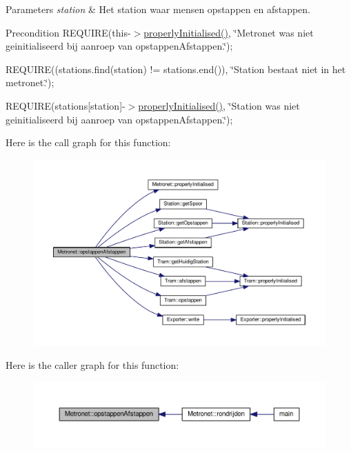 \begin{DoxyParams}{Parameters}
{\em station} & Het station waar mensen opstappen en afstappen. \\
\hline
\end{DoxyParams}
\begin{DoxyPrecond}{Precondition}
R\+E\+Q\+U\+I\+RE(this-\/$>$\hyperlink{class_metronet_a3d2adce29a947f162924279b766de645}{properly\+Initialised()}, \char`\"{}\+Metronet was niet geinitialiseerd bij aanroep van opstappen\+Afstappen.\char`\"{}); 

R\+E\+Q\+U\+I\+RE((stations.\+find(station) != stations.\+end()), \char`\"{}\+Station bestaat niet in het metronet.\char`\"{}); 

R\+E\+Q\+U\+I\+RE(stations\mbox{[}station\mbox{]}-\/$>$\hyperlink{class_metronet_a3d2adce29a947f162924279b766de645}{properly\+Initialised()}, \char`\"{}\+Station was niet geinitialiseerd bij aanroep van opstappen\+Afstappen.\char`\"{}); 
\end{DoxyPrecond}
Here is the call graph for this function\+:\nopagebreak
\begin{figure}[H]
\begin{center}
\leavevmode
\includegraphics[width=350pt]{class_metronet_a78c0cd9912306a5f7438ea43f5088e0a_cgraph}
\end{center}
\end{figure}
Here is the caller graph for this function\+:\nopagebreak
\begin{figure}[H]
\begin{center}
\leavevmode
\includegraphics[width=350pt]{class_metronet_a78c0cd9912306a5f7438ea43f5088e0a_icgraph}
\end{center}
\end{figure}
\mbox{\label{class_metronet_a3d8b85c241fff3a9353c06320226e84e}} 
